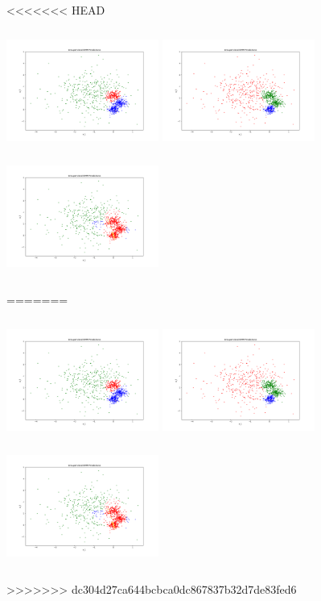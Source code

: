 <<<<<<< HEAD
\begin{answer}
\includegraphics[width=5cm, height=4cm]{pred_0.pdf}
\includegraphics[width=5cm, height=4cm]{pred_1.pdf}
\includegraphics[width=5cm, height=4cm]{pred_2.pdf}
\end{answer}
=======
\begin{answer}
\includegraphics[width=5cm, height=4cm]{pred_0.pdf}
\includegraphics[width=5cm, height=4cm]{pred_1.pdf}
\includegraphics[width=5cm, height=4cm]{pred_2.pdf}
\end{answer}
>>>>>>> dc304d27ca644bcbca0dc867837b32d7de83fed6
